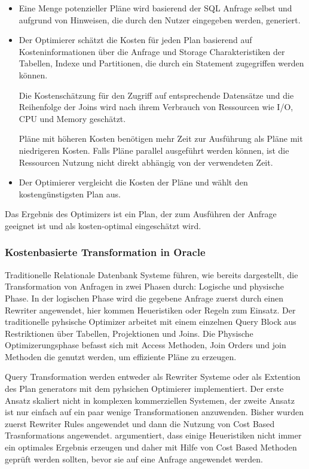 \begin{itemize}
\item Eine Menge potenzieller Pläne wird basierend der SQL Anfrage selbst und aufgrund von Hinweisen, die durch den Nutzer eingegeben werden, generiert.
\item Der Optimierer schätzt die Kosten für jeden Plan basierend auf Kosteninformationen über die Anfrage und Storage Charakteristiken der Tabellen, Indexe und Partitionen, die durch ein Statement zugegriffen werden können.

Die Kostenschätzung für den Zugriff auf entsprechende Datensätze und die Reihenfolge der Joins wird nach ihrem Verbrauch von Ressourcen wie I/O, CPU und Memory geschätzt.

Pläne mit höheren Kosten benötigen mehr Zeit zur Ausführung als Pläne mit niedrigeren Kosten. Falls Pläne parallel ausgeführt werden können, ist die Ressourcen Nutzung nicht direkt abhängig von der verwendeten Zeit.

\item Der Optimierer vergleicht die Kosten der Pläne und wählt den kostengünstigsten Plan aus.
\end{itemize}

Das Ergebnis des Optimizers ist ein Plan, der zum Ausführen der Anfrage geeignet ist und als kosten-optimal eingeschätzt wird.


\subsubsection{Kostenbasierte Transformation in Oracle}

Traditionelle Relationale Datenbank Systeme führen, wie bereits dargestellt, die Transformation von Anfragen in zwei Phasen durch: Logische und physische Phase. In der logischen Phase wird die gegebene Anfrage zuerst durch einen Rewriter angewendet, hier kommen Heueristiken oder Regeln zum Einsatz. Der traditionelle pyhsische Optimizer arbeitet mit einem einzelnen Query Block aus Restriktionen über Tabellen, Projektionen und Joins. Die Physische Optimizerungsphase befasst sich mit Access Methoden, Join Orders und join Methoden die genutzt werden, um effiziente Pläne zu erzeugen.

Query Transformation werden entweder als Rewriter Systeme oder als Extention des Plan generators mit dem pyhsichen Optimierer implementiert. Der erste Ansatz skaliert nicht in komplexen kommerziellen Systemen, der zweite Ansatz ist nur einfach auf ein paar wenige Transformationen anzuwenden. 
Bisher wurden zuerst Rewriter Rules angewendet und dann die Nutzung von Cost Based Trasnformations angewendet. \cite{ahmed2006cost} argumentiert, dass einige Heueristiken nicht immer ein optimales Ergebnis erzeugen und daher mit Hilfe von Cost Based Methoden geprüft werden sollten, bevor sie auf eine Anfrage angewendet werden.


